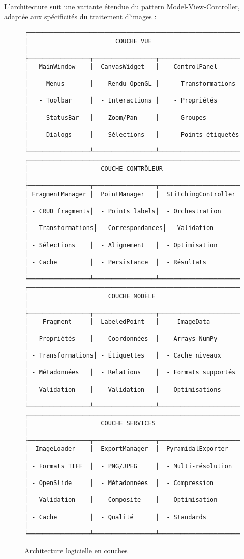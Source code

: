 \documentclass[12pt,a4paper]{report}
\begin{document}
L'architecture suit une variante étendue du pattern Model-View-Controller, adaptée aux spécificités du traitement d'images :

\begin{figure}[H]
\centering
\begin{verbatim}
┌─────────────────────────────────────────────────────────────┐
│                        COUCHE VUE                          │
├─────────────────┬─────────────────┬─────────────────────────┤
│   MainWindow    │  CanvasWidget   │    ControlPanel         │
│   - Menus       │  - Rendu OpenGL │    - Transformations    │
│   - Toolbar     │  - Interactions │    - Propriétés         │
│   - StatusBar   │  - Zoom/Pan     │    - Groupes            │
│   - Dialogs     │  - Sélections   │    - Points étiquetés   │
└─────────────────┴─────────────────┴─────────────────────────┘
┌─────────────────────────────────────────────────────────────┐
│                    COUCHE CONTRÔLEUR                       │
├─────────────────┬─────────────────┬─────────────────────────┤
│ FragmentManager │  PointManager   │  StitchingController    │
│ - CRUD fragments│  - Points labels│  - Orchestration        │
│ - Transformations│ - Correspondances│ - Validation           │
│ - Sélections    │  - Alignement   │  - Optimisation         │
│ - Cache         │  - Persistance  │  - Résultats           │
└─────────────────┴─────────────────┴─────────────────────────┘
┌─────────────────────────────────────────────────────────────┐
│                      COUCHE MODÈLE                         │
├─────────────────┬─────────────────┬─────────────────────────┤
│    Fragment     │  LabeledPoint   │     ImageData           │
│ - Propriétés    │  - Coordonnées  │  - Arrays NumPy         │
│ - Transformations│ - Étiquettes   │  - Cache niveaux        │
│ - Métadonnées   │  - Relations    │  - Formats supportés    │
│ - Validation    │  - Validation   │  - Optimisations        │
└─────────────────┴─────────────────┴─────────────────────────┘
┌─────────────────────────────────────────────────────────────┐
│                    COUCHE SERVICES                         │
├─────────────────┬─────────────────┬─────────────────────────┤
│  ImageLoader    │  ExportManager  │  PyramidalExporter      │
│ - Formats TIFF  │  - PNG/JPEG     │  - Multi-résolution     │
│ - OpenSlide     │  - Métadonnées  │  - Compression          │
│ - Validation    │  - Composite    │  - Optimisation         │
│ - Cache         │  - Qualité      │  - Standards            │
└─────────────────┴─────────────────┴─────────────────────────┘
\end{verbatim}
\caption{Architecture logicielle en couches}
\end{figure}
\end{document}
